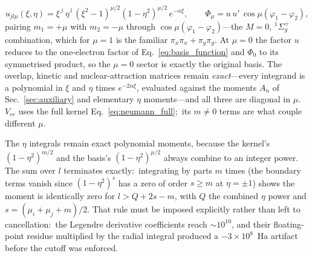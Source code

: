 \documentclass[aps,pra,twocolumn,superscriptaddress,longbibliography]{revtex4-2}
\begin{document}
\begin{equation}
  u_{j l \mu}(\xi,\eta) =
    \xi^{\,j}\,\eta^{\,l}\,
    (\xi^2-1)^{\mu/2}(1-\eta^2)^{\mu/2}\,e^{-\alpha\xi},
  \qquad
  \Phi_\mu = u\,u'\,\cos\mu(\varphi_1-\varphi_2),
  \label{eq:basis_mu}
\end{equation}
pairing $m_1 = +\mu$ with $m_2 = -\mu$ through
$\cos\mu(\varphi_1-\varphi_2)$---the $M = 0$, $^1\Sigma_g^+$
combination, which for $\mu = 1$ is the familiar
$\pi_x\pi_x + \pi_y\pi_y$.  At $\mu = 0$ the factor $u$ reduces to the one-electron factor of
Eq.~\eqref{eq:basis_function} and $\Phi_0$ to its symmetrised
product, so the $\mu = 0$ sector is exactly the original basis.  The overlap, kinetic and
nuclear-attraction matrices remain \emph{exact}---every integrand is
a polynomial in $\xi$ and $\eta$ times $e^{-2\alpha\xi}$, evaluated
against the moments $A_n$ of Sec.~\ref{sec:auxiliary} and
elementary $\eta$ moments---and all three are diagonal in $\mu$.
$V_{ee}$ uses the full kernel Eq.~\eqref{eq:neumann_full};\ its
$m \neq 0$ terms are what couple different $\mu$.

The $\eta$ integrals remain exact polynomial moments, because the
kernel's $(1-\eta^2)^{m/2}$ and the basis's $(1-\eta^2)^{\mu/2}$
always combine to an integer power.  The sum over $l$ terminates
exactly:\ integrating by parts $m$ times (the boundary terms vanish
since $(1-\eta^2)^{s}$ has a zero of order $s \ge m$ at
$\eta = \pm1$) shows the moment is identically zero for
$l > Q + 2s - m$, with $Q$ the combined $\eta$ power and
$s = (\mu_i + \mu_j + m)/2$.  That rule must be imposed
explicitly rather than left to cancellation:\ the Legendre
derivative coefficients reach $\sim\!10^{10}$, and their
floating-point residue multiplied by the radial integral produced a
$-3\times10^{8}$~Ha artifact before the cutoff was enforced.
\end{document}
